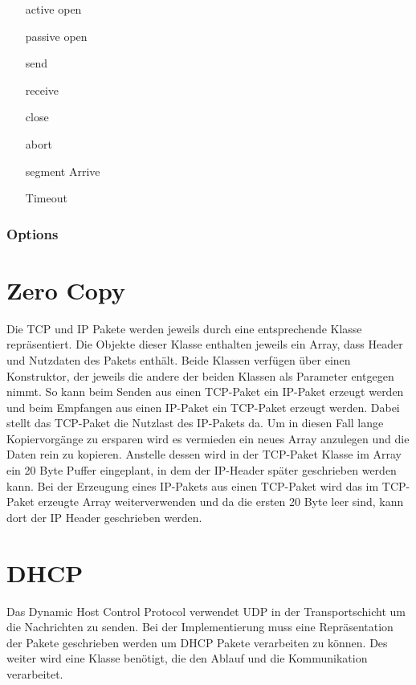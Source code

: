 	\begin{itemize}
		\item[active open]
		\item[passive open]
		\item[send]
		\item[receive]
		\item[close]
		\item[abort]
		\item[segment Arrive]
		\item[Timeout]
	\end{itemize}
\subsubsection{Options}

\section{Zero Copy}
Die TCP und IP Pakete werden jeweils durch eine entsprechende Klasse repräsentiert. Die Objekte dieser Klasse enthalten jeweils ein Array, dass Header und Nutzdaten des Pakets enthält. Beide Klassen verfügen über einen Konstruktor, der jeweils die andere der beiden Klassen als Parameter entgegen nimmt. So kann beim Senden aus einen TCP-Paket ein IP-Paket erzeugt werden und beim Empfangen aus einen IP-Paket ein TCP-Paket erzeugt werden. Dabei stellt das TCP-Paket die Nutzlast des IP-Pakets da. Um in diesen Fall lange Kopiervorgänge zu ersparen wird es vermieden ein neues Array anzulegen und die Daten rein zu kopieren. Anstelle dessen wird in der TCP-Paket Klasse im Array ein 20 Byte Puffer eingeplant, in dem der IP-Header später geschrieben werden kann. Bei der Erzeugung eines IP-Pakets aus einen TCP-Paket wird das im TCP-Paket erzeugte Array weiterverwenden und da die ersten 20 Byte leer sind, kann dort der IP Header geschrieben werden.


\section{DHCP}
Das Dynamic Host Control Protocol verwendet UDP in der Transportschicht um die Nachrichten zu senden. Bei der Implementierung muss eine Repräsentation der Pakete geschrieben werden um DHCP Pakete verarbeiten zu können. Des weiter wird eine Klasse benötigt, die den Ablauf und die Kommunikation verarbeitet. 

